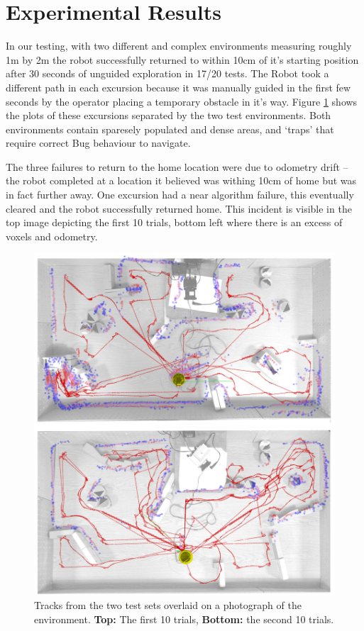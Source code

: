 \documentclass[11pt, a4paper]{article}
\begin{document}
\section{Experimental Results}
\label{Results}

In our testing, with two different and complex environments measuring roughly 1m by 2m the robot
successfully returned to within 10cm of it's starting position after 30 seconds of unguided exploration
in 17/20 tests. The Robot took a different path in each excursion because it was manually guided in the 
first few seconds by the operator placing a temporary obstacle in it's way. Figure \ref{resultsfigure} 
shows the plots of these excursions separated by the two test environments. Both environments contain
sparesely populated and dense areas, and `traps' that require correct Bug behaviour to navigate.

The three failures to return to the home location were due to odometry drift -- the robot completed at a
location it believed was withing 10cm of home but was in fact further away. One excursion had a near
algorithm failure, this eventually cleared and the robot successfully returned home. This incident
is visible in the top image depicting the first 10 trials, bottom left where there is an excess of 
voxels and odometry.

\begin{figure}[H]
  \begin{center}
    \includegraphics[width=35em]{../assets/multi_explore_figure.jpg}
  \end{center}
  \caption{\label{resultsfigure} Tracks from the two test sets overlaid on a photograph of the environment.
  \textbf{Top:} The first 10 trials, \textbf{Bottom:} the second 10 trials.}
\end{figure} 
\end{document}
